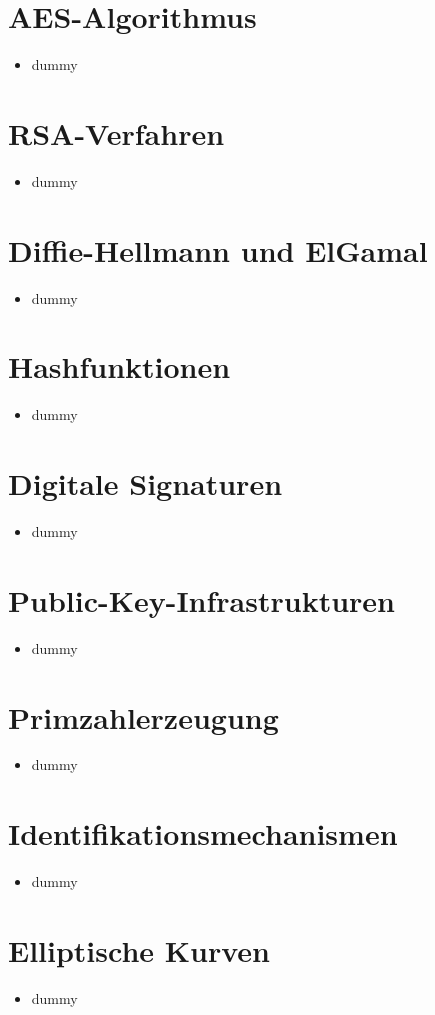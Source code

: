 \documentclass[11pt, paper=a4, twocolumn]{scrartcl}
\begin{document}
	\section{AES-Algorithmus}
		\begin{itemize}
			\item dummy
		\end{itemize}
	
	\section{RSA-Verfahren}
		\begin{itemize}
			\item dummy
		\end{itemize}
	
	\section{Diffie-Hellmann und ElGamal}
		\begin{itemize}
			\item dummy
		\end{itemize}
	
	\section{Hashfunktionen}
		\begin{itemize}
			\item dummy
		\end{itemize}
	
	\section{Digitale Signaturen}
		\begin{itemize}
			\item dummy
		\end{itemize}
	
	\section{Public-Key-Infrastrukturen}
		\begin{itemize}
			\item dummy
		\end{itemize}
	
	\section{Primzahlerzeugung}
		\begin{itemize}
			\item dummy
		\end{itemize}
	
	\section{Identifikationsmechanismen}
		\begin{itemize}
			\item dummy
		\end{itemize}
	
	\section{Elliptische Kurven}
		\begin{itemize}
			\item dummy
		\end{itemize}
\end{document}
